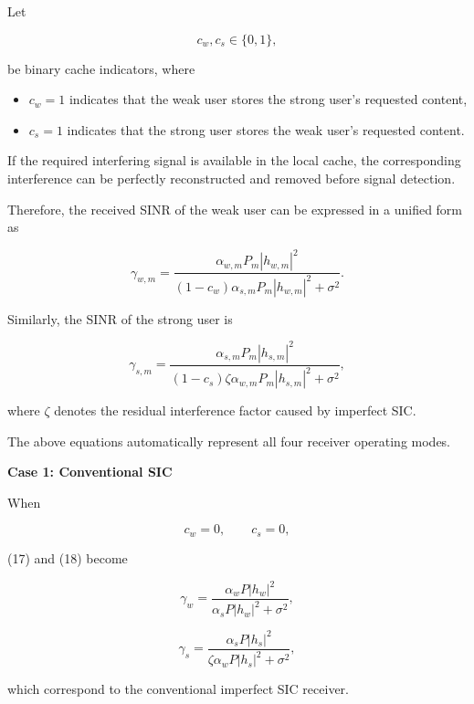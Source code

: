 \documentclass[conference]{IEEEtran}
\begin{document}
Let

\begin{equation}
c_w,c_s\in\{0,1\},
\end{equation}

be binary cache indicators, where

\begin{itemize}
\item $c_w=1$ indicates that the weak user stores the strong user's requested content,
\item $c_s=1$ indicates that the strong user stores the weak user's requested content.
\end{itemize}

If the required interfering signal is available in the local cache, the corresponding interference can be perfectly reconstructed and removed before signal detection.

Therefore, the received SINR of the weak user can be expressed in a unified form as

\begin{equation}
\gamma_{w,m}
=
\frac{\alpha_{w,m}P_m|h_{w,m}|^2}
{(1-c_w)\alpha_{s,m}P_m|h_{w,m}|^2+\sigma^2}.
\label{eq:UnifiedWeakSINR}
\end{equation}

Similarly, the SINR of the strong user is

\begin{equation}
\gamma_{s,m}
=
\frac{\alpha_{s,m}P_m|h_{s,m}|^2}
{(1-c_s)\zeta\alpha_{w,m}P_m|h_{s,m}|^2+\sigma^2},
\label{eq:UnifiedStrongSINR}
\end{equation}

where $\zeta$ denotes the residual interference factor caused by imperfect SIC.

The above equations automatically represent all four receiver operating modes.

\textbf{Case 1: Conventional SIC}

When

\[
c_w=0,\qquad c_s=0,
\]

(17) and (18) become

\begin{equation}
\gamma_w=
\frac{\alpha_wP|h_w|^2}
{\alpha_sP|h_w|^2+\sigma^2},
\end{equation}

\begin{equation}
\gamma_s=
\frac{\alpha_sP|h_s|^2}
{\zeta\alpha_wP|h_s|^2+\sigma^2},
\end{equation}

which correspond to the conventional imperfect SIC receiver.
\end{document}
